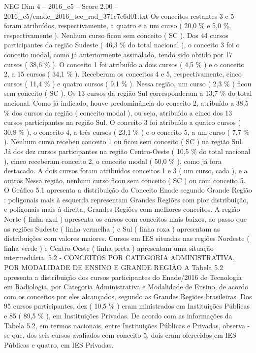 \begin{textsample}{NEG Dim 4 – 2016\_c5 – Score 2.00 – 2016\_c5/enade\_2016\_tec\_rad\_371c7e6d01.txt}
Os conceitos restantes 3 e 5 foram atribuídos, respectivamente, a quatro e a um curso ( 20,0 \% e 5,0 \%, respectivamente ).
Nenhum curso ficou sem conceito ( SC ).
Dos 44 cursos participantes da região Sudeste ( 46,3 \% do total nacional ), o conceito 3 foi o conceito modal, como já anteriormente assinalado, tendo sido obtido por 17 cursos ( 38,6 \% ).
O conceito 1 foi atribuído a dois cursos ( 4,5 \% ) e o conceito 2, a 15 cursos ( 34,1 \% ).
Receberam os conceitos 4 e 5, respectivamente, cinco cursos ( 11,4 \% ) e quatro cursos ( 9,1 \% ).
Nessa região, um curso ( 2,3 \% ) ficou sem conceito ( SC ).
Os 13 cursos da região Sul corresponderam a 13,7 \% do total nacional.
Como já indicado, houve predominância do conceito 2, atribuído a 38,5 \% dos cursos da região ( conceito modal ), ou seja, atribuído a cinco dos 13 cursos participantes na região Sul.
O conceito 3 foi atribuído a quatro cursos ( 30,8 \% ), o conceito 4, a três cursos ( 23,1 \% ) e o conceito 5, a um curso ( 7,7 \% ).
Nenhum curso recebeu conceito 1 ou ficou sem conceito ( SC ) na região Sul.
Já dos dez cursos participantes na região Centro-Oeste ( 10,5 \% do total nacional ), cinco receberam conceito 2, o conceito modal ( 50,0 \% ), como já fora destacado.
A dois cursos foram atribuídos conceitos 1 e 3 ( um curso, cada ), e a outros Nessa região, nenhum curso ficou sem conceito ( SC ) ou com conceito 5.
O Gráfico 5.1 apresenta a distribuição do Conceito Enade segundo Grande Região : poligonais mais à esquerda representam Grandes Regiões com pior distribuição, e poligonais mais à direita, Grandes Regiões com melhores conceitos.
A região Norte ( linha azul ) apresenta os cursos com conceitos mais baixos, ao passo que as regiões Sudeste ( linha vermelha ) e Sul ( linha roxa ) apresentam as distribuições com valores maiores.
Cursos em IES situadas nas regiões Nordeste ( linha verde ) e Centro-Oeste ( linha preta ) apresentam uma situação intermediária. 5.2 - CONCEITOS POR CATEGORIA ADMINISTRATIVA, POR MODALIDADE DE ENSINO E GRANDE REGIÃO A Tabela 5.2 apresenta a distribuição dos cursos participantes do Enade/2016 de Tecnologia em Radiologia, por Categoria Administrativa e Modalidade de Ensino, de acordo com os conceitos por eles alcançados, segundo as Grandes Regiões brasileiras.
Dos 95 cursos participantes, dez ( 10,5 \% ) eram ministrados em Instituições Públicas e 85 ( 89,5 \% ), em Instituições Privadas.
De acordo com as informações da Tabela 5.2, em termos nacionais, entre Instituições Públicas e Privadas, observa -se que, dos seis cursos avaliados com conceito 5, dois eram oferecidos em IES Públicas e quatro, em IES Privadas.

\end{textsample}
